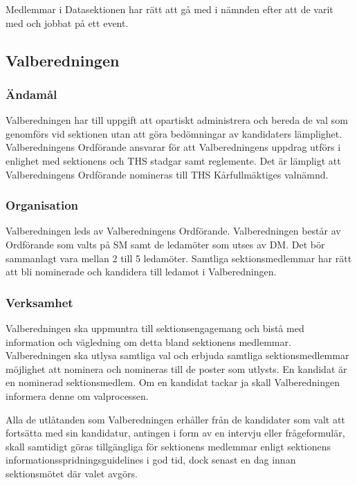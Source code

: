 \documentclass{dgovdoc}
\begin{document}
Medlemmar i Datasektionen har rätt att gå med i nämnden efter att de varit med och jobbat på ett event. 

\subsection{Valberedningen}

\subsubsection{Ändamål}

Valberedningen har till uppgift att opartiskt administrera och bereda de
val som genomförs vid sektionen utan att göra bedömningar av kandidaters
lämplighet. Valberedningens Ordförande ansvarar för att Valberedningens
uppdrag utförs i enlighet med sektionens och THS stadgar samt reglemente.
Det är lämpligt att Valberedningens Ordförande nomineras till
THS Kårfullmäktiges valnämnd.

\subsubsection{Organisation}

Valberedningen leds av Valberedningens Ordförande. Valberedningen består av
Ordförande som valts på SM samt de ledamöter som utses av DM. Det bör
sammanlagt vara mellan 2 till 5 ledamöter. Samtliga sektionsmedlemmar
har rätt att bli nominerade och kandidera till ledamot i Valberedningen.

\subsubsection{Verksamhet}

Valberedningen ska uppmuntra till sektionsengagemang och bistå med information
och vägledning om detta bland sektionens medlemmar. Valberedningen ska utlysa
samtliga val och erbjuda samtliga sektionsmedlemmar möjlighet att nominera och
nomineras till de poster som utlysts. En kandidat är en nominerad sektionsmedlem.
Om en kandidat tackar ja skall Valberedningen informera denne om valprocessen.

Alla de utlåtanden som Valberedningen erhåller från de kandidater som valt att
fortsätta med sin kandidatur, antingen i form av en intervju eller frågeformulär,
skall samtidigt göras tillgängliga för sektionens medlemmar enligt sektionens
informationsspridningsguidelines i god tid, dock senast en dag innan sektionsmötet
där valet avgörs.
\end{document}

